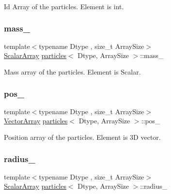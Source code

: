 Id Array of the particles. Element is int. 

\mbox{\label{classparticles_a5a2c6b7e9db9350238b8e8b722fa97e1}} 
\subsubsection{\texorpdfstring{mass\+\_\+}{mass\_}}
{\footnotesize\ttfamily template$<$typename Dtype , size\+\_\+t Array\+Size$>$ \\
\mbox{\hyperlink{classparticles_ac88daa0d493d17c5ca2fe3a1d3fe4779}{Scalar\+Array}} \mbox{\hyperlink{classparticles}{particles}}$<$ Dtype, Array\+Size $>$\+::mass\+\_\+\hspace{0.3cm}{\ttfamily [protected]}}



Mass array of the particles. Element is Scalar. 

\mbox{\label{classparticles_a99e8c11e0b53e2447478bca11625fbd7}} 
\subsubsection{\texorpdfstring{pos\+\_\+}{pos\_}}
{\footnotesize\ttfamily template$<$typename Dtype , size\+\_\+t Array\+Size$>$ \\
\mbox{\hyperlink{classparticles_ac5dddc8c666e4f7057b5109f95926363}{Vector\+Array}} \mbox{\hyperlink{classparticles}{particles}}$<$ Dtype, Array\+Size $>$\+::pos\+\_\+\hspace{0.3cm}{\ttfamily [protected]}}



Position array of the particles. Element is 3D vector. 

\mbox{\label{classparticles_a9e59d320a88772648f773687a817db6d}} 
\subsubsection{\texorpdfstring{radius\+\_\+}{radius\_}}
{\footnotesize\ttfamily template$<$typename Dtype , size\+\_\+t Array\+Size$>$ \\
\mbox{\hyperlink{classparticles_ac88daa0d493d17c5ca2fe3a1d3fe4779}{Scalar\+Array}} \mbox{\hyperlink{classparticles}{particles}}$<$ Dtype, Array\+Size $>$\+::radius\+\_\+\hspace{0.3cm}{\ttfamily [protected]}}



